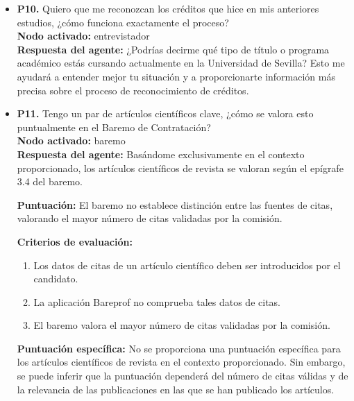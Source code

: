 \documentclass{article}
\begin{document}
\begin{itemize}
            Recuerda que es importante verificar que las facturas incluyan los datos fiscales de la persona que realiza el viaje y no los de la Universidad de Sevilla.

      \item \textbf{P10.} Quiero que me reconozcan los créditos que hice en mis anteriores estudios, ¿cómo funciona exactamente el proceso? \\
            \textbf{Nodo activado:} entrevistador \\
            \textbf{Respuesta del agente:} ¿Podrías decirme qué tipo de título o programa académico estás cursando actualmente en la Universidad de Sevilla? Esto me ayudará a entender mejor tu situación y a proporcionarte información más precisa sobre el proceso de reconocimiento de créditos.

      \item \textbf{P11.} Tengo un par de artículos científicos clave, ¿cómo se valora esto puntualmente en el Baremo de Contratación? \\
            \textbf{Nodo activado:} baremo \\
            \textbf{Respuesta del agente:} Basándome exclusivamente en el contexto proporcionado, los artículos científicos de revista se valoran según el epígrafe 3.4 del baremo.

            \textbf{Puntuación:} El baremo no establece distinción entre las fuentes de citas, valorando el mayor número de citas validadas por la comisión.

            \textbf{Criterios de evaluación:}

            \begin{enumerate}
                \item Los datos de citas de un artículo científico deben ser introducidos por el candidato.
                \item La aplicación Bareprof no comprueba tales datos de citas.
                \item El baremo valora el mayor número de citas validadas por la comisión.
            \end{enumerate}

            \textbf{Puntuación específica:} No se proporciona una puntuación específica para los artículos científicos de revista en el contexto proporcionado. Sin embargo, se puede inferir que la puntuación dependerá del número de citas válidas y de la relevancia de las publicaciones en las que se han publicado los artículos.


\end{itemize}
\end{document}
